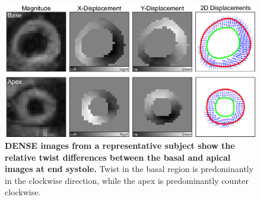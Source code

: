 	\begin{figure}
		\centering %
		\includegraphics{figures/torsionpaper/Fig7-DENSE_example}
		\caption[DENSE images from a representative subject show the relative twist differences between the basal and apical images at end systole]{\textbf{DENSE images from a representative subject show the relative twist differences between the basal and apical images at end systole.} Twist in the basal region is predominantly in the clockwise direction, while the apex is predominantly counter clockwise.}
		\label{fig:dense_example}
	\end{figure}
	
